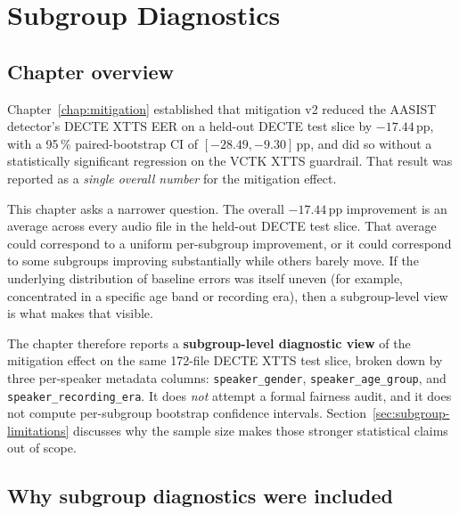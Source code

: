 \cleardoubleoddpage
\chapter{Subgroup Diagnostics}
\label{chap:subgroup-diagnostics}



\section{Chapter overview}
\label{sec:subgroup-overview}

Chapter~\ref{chap:mitigation} established that mitigation v2 reduced the AASIST
detector's DECTE XTTS EER on a held-out DECTE test slice by
$-17.44$\,pp, with a 95\,\% paired-bootstrap CI of $[-28.49, -9.30]$\,pp,
and did so without a statistically significant regression on the
VCTK XTTS guardrail. That result was reported as a \emph{single overall
number} for the mitigation effect.

This chapter asks a narrower question. The overall $-17.44$\,pp
improvement is an average across every audio file in the held-out
DECTE test slice. That average could correspond to a uniform
per-subgroup improvement, or it could correspond to some subgroups
improving substantially while others barely move. If the underlying
distribution of baseline errors was itself uneven (for example,
concentrated in a specific age band or recording era), then a
subgroup-level view is what makes that visible.

The chapter therefore reports a \textbf{subgroup-level diagnostic view}
of the mitigation effect on the same 172-file DECTE XTTS test
slice, broken down by three per-speaker metadata columns:
\texttt{speaker\_gender}, \texttt{speaker\_age\_group}, and \texttt{speaker\_recording\_era}.
It does \emph{not} attempt a formal fairness audit, and it does not
compute per-subgroup bootstrap confidence intervals.
Section~\ref{sec:subgroup-limitations} discusses why the sample size makes those stronger
statistical claims out of scope.


\section{Why subgroup diagnostics were included}
\label{sec:subgroup-rationale}

